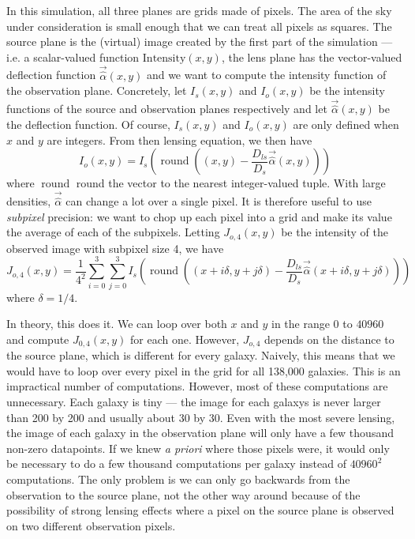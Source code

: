 \documentclass[10pt,twoside]{article}
\theoremstyle{definition}
\theoremstyle{exercise}
\begin{document}
In this simulation, all three planes are grids made of pixels. The area of the sky under consideration is small enough that we can treat all pixels as squares. The source plane is the (virtual) image created by the first part of the simulation --- i.e. a scalar-valued function $\text{Intensity}(x,y)$, the lens plane has the vector-valued deflection function $\vec{\hat{\alpha}}(x,y)$ and we want to compute the intensity function of the observation plane. Concretely, let $I_s(x,y)$ and $I_o(x,y)$ be the intensity functions of the source and observation planes respectively and let $\vec{\hat{\alpha}}(x,y)$ be the deflection function. Of course, $I_s(x,y)$ and $I_o(x,y)$ are only defined when $x$ and $y$ are integers. From then lensing equation, we then have
\begin{equation}
  I_o(x,y) = I_s\left(\operatorname{round}\left((x,y) - \frac{D_{ls}}{D_s}\vec{\hat{\alpha}}(x,y)\right) \right)
  \label{eq:discrete_lens}
\end{equation}
where $\operatorname{round}$ round the vector to the nearest integer-valued tuple. With large densities, $\vec{\hat{\alpha}}$ can change a lot over a single pixel. It is therefore useful to use \textit{subpixel} precision: we want to chop up each pixel into a grid and make its value the average of each of the subpixels. Letting $J_{o,4}(x,y)$ be the intensity of the observed image with subpixel size 4, we have
\begin{equation}
  J_{o,4}(x,y) = \frac{1}{4^2} \sum_{i=0}^3 \sum_{j=0}^3 I_s\left( \operatorname{round}\left( (x+i\delta, y+j\delta) - \frac{D_{ls}}{D_s}\vec{\hat{\alpha}}(x+i\delta, y+j\delta) \right) \right)
  \label{eq:discrete_lens_subpixel}
\end{equation}
where $\delta = 1/4$. 

In theory, this does it. We can loop over both $x$ and $y$ in the range $0$ to $40960$ and compute $J_{0,4}(x,y)$ for each one. However, $J_{o,4}$ depends on the distance to the source plane, which is different for every galaxy. Naively, this means that we would have to loop over every pixel in the grid for all 138,000 galaxies. This is an impractical number of computations. However, most of these computations are unnecessary. Each galaxy is tiny --- the image for each galaxys is never larger than 200 by 200 and usually about 30 by 30. Even with the most severe lensing, the image of each galaxy in the observation plane will only have a few thousand non-zero datapoints. If we knew \textit{a priori} where those pixels were, it would only be necessary to do a few thousand computations per galaxy instead of $40960^2$ computations. The only problem is we can only go backwards from the observation to the source plane, not the other way around because of the possibility of strong lensing effects where a pixel on the source plane is observed on two different observation pixels.
\end{document}
